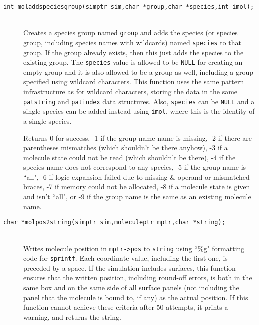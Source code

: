 \documentclass {book}
\begin{document}
\begin{description}
\item[\texttt{int moladdspeciesgroup(simptr sim,char *group,char *species,int imol);}]
\hfill \\
Creates a species group named \texttt{group} and adds the species (or species group, including species names with wildcards) named \texttt{species} to that group. If the group already exists, then this just adds the species to the existing group. The \texttt{species} value is allowed to be \texttt{NULL} for creating an empty group and it is also allowed to be a group as well, including a group specified using wildcard characters. This function uses the same pattern infrastructure as for wildcard characters, storing the data in the same \texttt{patstring} and \texttt{patindex} data structures. Also, \texttt{species} can be \texttt{NULL} and a single species can be added instead using \texttt{imol}, where this is the identity of a single species.

Returns 0 for success, -1 if the group name name is missing, -2 if there are parentheses mismatches (which shouldn't be there anyhow), -3 if a molecule state could not be read (which shouldn't be there), -4 if the species name does not correspond to any species, -5 if the group name is ``all", -6 if logic expansion failed due to missing \& operand or mismatched braces, -7 if memory could not be allocated, -8 if a molecule state is given and isn't ``all", or -9 if the group name is the same as an existing molecule name.

\item[\texttt{char *molpos2string(simptr sim,moleculeptr mptr,char *string);}]
\hfill \\
Writes molecule position in \texttt{mptr->pos} to \texttt{string} using ``\%g" formatting code for \texttt{sprintf}. Each coordinate value, including the first one, is preceded by a space. If the simulation includes surfaces, this function ensures that the written position, including round-off errors, is both in the same box and on the same side of all surface panels (not including the panel that the molecule is bound to, if any) as the actual position. If this function cannot achieve these criteria after 50 attempts, it prints a warning, and returns the string.


\end{description}
\end{document}
